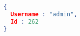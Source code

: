 \begin{lstlisting}[language=json,firstnumber=1]
{
  Username : "admin",
  Id : 262
}
\end{lstlisting}
